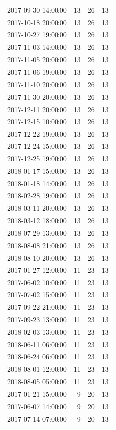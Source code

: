 \begin{tabular}{lrrr}
2017-09-30 14:00:00 & 13 & 26 & 13 \\
2017-10-18 20:00:00 & 13 & 26 & 13 \\
2017-10-27 19:00:00 & 13 & 26 & 13 \\
2017-11-03 14:00:00 & 13 & 26 & 13 \\
2017-11-05 20:00:00 & 13 & 26 & 13 \\
2017-11-06 19:00:00 & 13 & 26 & 13 \\
2017-11-10 20:00:00 & 13 & 26 & 13 \\
2017-11-30 20:00:00 & 13 & 26 & 13 \\
2017-12-11 20:00:00 & 13 & 26 & 13 \\
2017-12-15 10:00:00 & 13 & 26 & 13 \\
2017-12-22 19:00:00 & 13 & 26 & 13 \\
2017-12-24 15:00:00 & 13 & 26 & 13 \\
2017-12-25 19:00:00 & 13 & 26 & 13 \\
2018-01-17 15:00:00 & 13 & 26 & 13 \\
2018-01-18 14:00:00 & 13 & 26 & 13 \\
2018-02-28 19:00:00 & 13 & 26 & 13 \\
2018-03-11 20:00:00 & 13 & 26 & 13 \\
2018-03-12 18:00:00 & 13 & 26 & 13 \\
2018-07-29 13:00:00 & 13 & 26 & 13 \\
2018-08-08 21:00:00 & 13 & 26 & 13 \\
2018-08-10 20:00:00 & 13 & 26 & 13 \\
2017-01-27 12:00:00 & 11 & 23 & 13 \\
2017-06-02 10:00:00 & 11 & 23 & 13 \\
2017-07-02 15:00:00 & 11 & 23 & 13 \\
2017-09-22 21:00:00 & 11 & 23 & 13 \\
2017-09-23 13:00:00 & 11 & 23 & 13 \\
2018-02-03 13:00:00 & 11 & 23 & 13 \\
2018-06-11 06:00:00 & 11 & 23 & 13 \\
2018-06-24 06:00:00 & 11 & 23 & 13 \\
2018-08-01 12:00:00 & 11 & 23 & 13 \\
2018-08-05 05:00:00 & 11 & 23 & 13 \\
2017-01-21 15:00:00 & 9 & 20 & 13 \\
2017-06-07 14:00:00 & 9 & 20 & 13 \\
2017-07-14 07:00:00 & 9 & 20 & 13 \\

\end{tabular}
